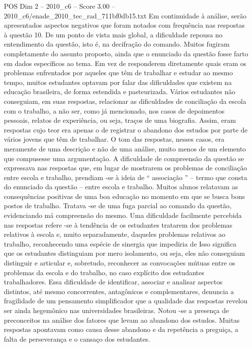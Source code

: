 \begin{textsample}{POS Dim 2 – 2010\_c6 – Score 3.00 – 2010\_c6/enade\_2010\_tec\_rad\_711bf0db15.txt}
Em continuidade à análise, serão apresentados aspectos negativos que foram notados com frequência nas respostas à questão 10.
De um ponto de vista mais global, a dificuldade repousa no entendimento da questão, isto é, na decifração do comando.
Muitos fugiram completamente do assunto proposto, ainda que o enunciado da questão fosse farto em dados específicos ao tema.
Em vez de responderem diretamente quais eram os problemas enfrentados por aqueles que têm de trabalhar e estudar ao mesmo tempo, muitos estudantes optavam por falar das dificuldades que existem na educação brasileira, de forma estendida e pasteurizada.
Vários estudantes não conseguiam, em suas respostas, relacionar as dificuldades de conciliação da escola com o trabalho, a não ser, como já mencionado, nos casos de depoimentos pessoais, relatos de experiência, ou seja, traços de uma biografia.
Assim, eram respostas cujo teor era apenas o de registrar o abandono dos estudos por parte de vários jovens que têm de trabalhar.
O tom das respostas, nesses casos, era meramente de uma descrição e não de uma análise, muito menos de um elemento que compusesse uma argumentação.
A dificuldade de compreensão da questão se expressava nas respostas que, em lugar de mostrarem os problemas de conciliação entre escola e trabalho, prendiam -se à ideia de “ associação ” – termo que consta do enunciado da questão – entre escola e trabalho.
Muitos alunos relatavam as consequências positivas de uma boa educação no momento em que se busca bons postos de trabalho.
Tratava -se de uma fuga parcial ao comando da questão, evidenciando má compreensão do mesmo.
Uma dificuldade facilmente percebida nas respostas refere -se à tendência de os estudantes tratarem dos problemas relativos à escola e, muito separadamente, daqueles problemas relativos ao trabalho, reconhecendo uma espécie de sinergia que impediria de Isso significa que os estudantes distinguiam por mero isolamento, ou seja, eles não conseguiam distinguir e articular e, sobretudo, reconhecer as convocações mútuas entre os problemas da escola e do trabalho, no caso explícito dos estudantes trabalhadores.
Essa dificuldade de identificar, associar e analisar aspectos distintos, até mesmo concorrentes, antagônicos e complementares, denuncia a fragilidade de um pensamento simplificador que a qualidade das respostas revelou ser ainda hegemônico nas universidades brasileiras.
Notou -se a presença de preconceitos na análise dos fatores que levam ao abandono dos estudos.
Muitas respostas apontavam como causa desse abandono e da repetência a preguiça, a falta de perseverança e o cansaço dos estudantes.

\end{textsample}
